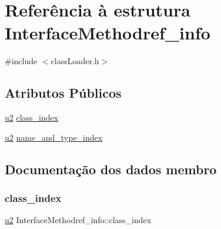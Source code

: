 \hypertarget{struct_interface_methodref__info}{}\section{Referência à estrutura Interface\+Methodref\+\_\+info}
\label{struct_interface_methodref__info}


{\ttfamily \#include $<$class\+Loader.\+h$>$}

\subsection*{Atributos Públicos}
\begin{DoxyCompactItemize}
\item 
\hyperlink{util_8h_a55ef8d87fd202b8417704c089899c5b9}{u2} \hyperlink{struct_interface_methodref__info_a755fc0e166eba213de63fecd84d39fe6}{class\+\_\+index}
\item 
\hyperlink{util_8h_a55ef8d87fd202b8417704c089899c5b9}{u2} \hyperlink{struct_interface_methodref__info_acac8c45ec243407d43e67de88a21cf25}{name\+\_\+and\+\_\+type\+\_\+index}
\end{DoxyCompactItemize}


\subsection{Documentação dos dados membro}
\mbox{\label{struct_interface_methodref__info_a755fc0e166eba213de63fecd84d39fe6}} 
\subsubsection{\texorpdfstring{class\+\_\+index}{class\_index}}
{\footnotesize\ttfamily \hyperlink{util_8h_a55ef8d87fd202b8417704c089899c5b9}{u2} Interface\+Methodref\+\_\+info\+::class\+\_\+index}

\mbox{\label{struct_interface_methodref__info_acac8c45ec243407d43e67de88a21cf25}} 
